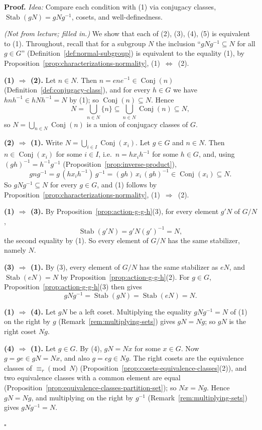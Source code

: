 \documentclass[11pt]{report}
\renewenvironment{proof}[1][Proof]{\noindent\textbf{#1.} }{\hfill$\square$\par\vspace{5pt}}
\begin{document}
\begin{proof}
\textit{Idea:} Compare each condition with (1) via conjugacy classes, $\operatorname{Stab}(gN) = gNg^{-1}$, cosets, and well-definedness.\par
\textit{(Not from lecture; filled in.)} We show that each of (2), (3), (4), (5) is equivalent to (1). Throughout, recall that for a subgroup $N$ the inclusion ``$gNg^{-1} \subseteq N$ for all $g \in G$'' (Definition~\ref{def:normal-subgroup}) is equivalent to the equality (1), by Proposition~\ref{prop:characterizations-normality}, (1)~$\Leftrightarrow$~(2).

\textbf{(1) $\Rightarrow$ (2).} Let $n \in N$. Then $n = ene^{-1} \in \operatorname{Conj}(n)$ (Definition~\ref{def:conjugacy-class}), and for every $h \in G$ we have $hnh^{-1} \in hNh^{-1} = N$ by (1); so $\operatorname{Conj}(n) \subseteq N$. Hence
\[ N = \bigcup_{n \in N} \{n\} \subseteq \bigcup_{n \in N} \operatorname{Conj}(n) \subseteq N, \]
so $N = \bigcup_{n \in N} \operatorname{Conj}(n)$ is a union of conjugacy classes of $G$.

\textbf{(2) $\Rightarrow$ (1).} Write $N = \bigcup_{i \in I} \operatorname{Conj}(x_i)$. Let $g \in G$ and $n \in N$. Then $n \in \operatorname{Conj}(x_i)$ for some $i \in I$, i.e.\ $n = hx_ih^{-1}$ for some $h \in G$, and, using $(gh)^{-1} = h^{-1}g^{-1}$ (Proposition~\ref{prop:inverse-product}),
\[ gng^{-1} = g\,(hx_ih^{-1})\,g^{-1} = (gh)\,x_i\,(gh)^{-1} \in \operatorname{Conj}(x_i) \subseteq N. \]
So $gNg^{-1} \subseteq N$ for every $g \in G$, and (1) follows by Proposition~\ref{prop:characterizations-normality}, (1)~$\Rightarrow$~(2).

\textbf{(1) $\Rightarrow$ (3).} By Proposition~\ref{prop:action-g-g-h}(3), for every element $g'N$ of $G/N$,
\[ \operatorname{Stab}(g'N) = g'N(g')^{-1} = N, \]
the second equality by (1). So every element of $G/N$ has the same stabilizer, namely $N$.

\textbf{(3) $\Rightarrow$ (1).} By (3), every element of $G/N$ has the same stabilizer as $eN$, and $\operatorname{Stab}(eN) = N$ by Proposition~\ref{prop:action-g-g-h}(2). For $g \in G$, Proposition~\ref{prop:action-g-g-h}(3) then gives
\[ gNg^{-1} = \operatorname{Stab}(gN) = \operatorname{Stab}(eN) = N. \]

\textbf{(1) $\Rightarrow$ (4).} Let $gN$ be a left coset. Multiplying the equality $gNg^{-1} = N$ of (1) on the right by $g$ (Remark~\ref{rem:multiplying-sets}) gives $gN = Ng$; so $gN$ is the right coset $Ng$.

\textbf{(4) $\Rightarrow$ (1).} Let $g \in G$. By (4), $gN = Nx$ for some $x \in G$. Now $g = ge \in gN = Nx$, and also $g = eg \in Ng$. The right cosets are the equivalence classes of $\equiv_r \pmod N$ (Proposition~\ref{prop:cosets-equivalence-classes}(2)), and two equivalence classes with a common element are equal (Proposition~\ref{prop:equivalence-classes-partition-set}); so $Nx = Ng$. Hence $gN = Ng$, and multiplying on the right by $g^{-1}$ (Remark~\ref{rem:multiplying-sets}) gives $gNg^{-1} = N$.


\end{proof}
\end{document}
